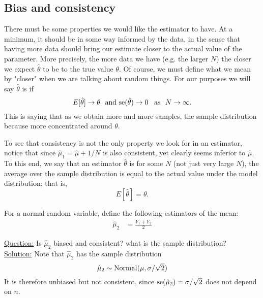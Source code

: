 \subsection{Bias and consistency}

 There must be some properties we would like the estimator to have. At a minimum, it should be in some way informed by the data, in the sense that having more data should bring our estimate closer to the actual value of the parameter. More precisely, the more data we have (e.g. the larger $N$) the closer we expect $\hat{\theta}$ to be to the true value $\theta$. Of course, we must define what we mean by "closer" when we are talking about random things. 
For our purposes we will say $\hat{\theta}$ is  if 
\begin{equation*}
E[\hat{\theta}] \to \theta\,\,\text{ and } {\rm se}(\hat{\theta})  \to 0 \,\,\,\text{ as }\,\, N\to \infty. 
\end{equation*}
This is saying that as we obtain more and more samples, the sample distribution because more concentrated around $\theta$. 


To see that consistency is not the only property we look for in an estimator, notice that since $\hat{\mu}_1 = \hat{\mu} + 1/N$ is also consistent, yet clearly seems inferior to $\hat{\mu}$. To this end, we say that an estimator $\hat{\theta}$ is  for some $N$ (not just very large $N$), the average over the sample distribution is equal to the actual value under the model distribution; that is, 
\begin{equation*}
E[\hat{\theta}] = \theta. 
\end{equation*} 

\begin{example}
For a normal random variable, define the following estimators of the mean:
\begin{align*}
\hat{\mu}_2 &= \frac{Y_1 + Y_2}{2}
\end{align*}

\noindent
\underline{Question:}  Is $\hat{\mu}_2$ biased and consistent? what is the sample distribution?\\


\noindent
\underline{Solution:}
Note that $\hat{\mu}_2$ has the sample distribution 
\begin{equation*}
\hat{\mu}_2  \sim {\rm Normal}(\mu,\sigma/\sqrt{2})
\end{equation*}
It is therefore unbiased but not consistent, since ${\rm se}(\hat{\mu}_2) = \sigma/\sqrt{2}$ does not depend on $n$. 
\end{example}



